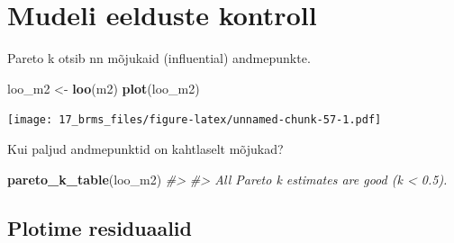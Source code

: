 \documentclass[]{book}
\newenvironment{Shaded}{\begin{snugshade}}{\end{snugshade}}
\newcommand{\CommentTok}[1]{\textcolor[rgb]{0.56,0.35,0.01}{\textit{#1}}}
\newcommand{\DataTypeTok}[1]{\textcolor[rgb]{0.13,0.29,0.53}{#1}}
\newcommand{\DecValTok}[1]{\textcolor[rgb]{0.00,0.00,0.81}{#1}}
\newcommand{\KeywordTok}[1]{\textcolor[rgb]{0.13,0.29,0.53}{\textbf{#1}}}
\newcommand{\NormalTok}[1]{#1}
\newcommand{\OperatorTok}[1]{\textcolor[rgb]{0.81,0.36,0.00}{\textbf{#1}}}
\newcommand{\StringTok}[1]{\textcolor[rgb]{0.31,0.60,0.02}{#1}}
\begin{document}
\begin{Shaded}
\end{Shaded}

\hypertarget{mudeli-eelduste-kontroll}{%
\section{Mudeli eelduste kontroll}\label{mudeli-eelduste-kontroll}}

Pareto k otsib nn mõjukaid (influential) andmepunkte.

\begin{Shaded}
\begin{Highlighting}[]
\NormalTok{loo_m2 <-}\StringTok{ }\KeywordTok{loo}\NormalTok{(m2)}
\KeywordTok{plot}\NormalTok{(loo_m2)}
\end{Highlighting}
\end{Shaded}

\texttt{[image: 17\_brms\_files/figure-latex/unnamed-chunk-57-1.pdf]}

Kui paljud andmepunktid on kahtlaselt mõjukad?

\begin{Shaded}
\begin{Highlighting}[]
\KeywordTok{pareto_k_table}\NormalTok{(loo_m2) }
\CommentTok{#> }
\CommentTok{#> All Pareto k estimates are good (k < 0.5).}
\end{Highlighting}
\end{Shaded}

\hypertarget{plotime-residuaalid}{%
\subsection{Plotime residuaalid}\label{plotime-residuaalid}}
\end{document}
